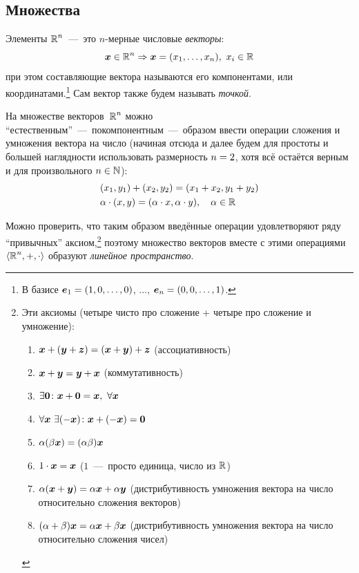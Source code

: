 \documentclass[a4paper,12pt]{article}
\begin{document}

  \subsection{Множества}

  Элементы $\operatorname{\mathbb R}^n$~---~это $n$-мерные числовые \emph{векторы}:
  \[
    \boldsymbol x \in \operatorname{\mathbb R}^n \Rightarrow \boldsymbol x = (x_1, \ldots, x_n),\ x_i \in \operatorname{\mathbb R}
  \]
  при этом составляющие вектора называются его компонентами, или координатами.\footnote{
    В базисе $\bds e_1 \hm= (1, 0, \ldots, 0)$, ..., $\bds e_n \hm= (0, 0, \ldots, 1)$.
  }
  Сам вектор также будем называть \emph{точкой}.

  На множестве векторов~$\operatorname{\mathbb R}^n$ можно ``естественным''~---~покомпонентным~---~образом ввести операции сложения и умножения вектора на число (начиная отсюда и далее будем для простоты и большей наглядности использовать размерность $n \hm= 2$, хотя всё остаётся верным и для произвольного $n \in \mathbb N$):
  \[
    \begin{aligned}
      &(x_1, y_1) + (x_2, y_2) = (x_1 + x_2, y_1 + y_2)\\
      &\alpha \cdot (x, y) = (\alpha \cdot x, \alpha \cdot y),\quad \alpha \in \operatorname{\mathbb R}
    \end{aligned}
  \]

  Можно проверить, что таким образом введённые операции удовлетворяют ряду ``привычных'' аксиом,\footnote{
    Эти аксиомы (четыре чисто про сложение + четыре про сложение и умножение):
    \begin{enumerate}
      \item $\boldsymbol x + (\boldsymbol y + \boldsymbol z) = (\boldsymbol x + \boldsymbol y) + \boldsymbol z$ (ассоциативность)
      \item $\boldsymbol x + \boldsymbol y = \boldsymbol y + \boldsymbol x$ (коммутативность)
      \item $\exists \boldsymbol 0\colon \boldsymbol x + \boldsymbol 0 = \boldsymbol x,\ \forall \boldsymbol x$
      \item $\forall \boldsymbol x\ \exists (-\boldsymbol x)\colon \boldsymbol x + (-\boldsymbol x) = \boldsymbol 0$
      \item $\alpha (\beta \boldsymbol x) = (\alpha \beta) \boldsymbol x$
      \item $1 \cdot \boldsymbol x = \boldsymbol x$ ($1$~---~просто единица, число из $\operatorname{\mathbb R}$)
      \item $\alpha (\boldsymbol x + \boldsymbol y) = \alpha \boldsymbol x + \alpha \boldsymbol y$ (дистрибутивность умножения вектора на число относительно сложения векторов)
      \item $(\alpha + \beta) \boldsymbol x = \alpha \boldsymbol x + \beta \boldsymbol x$ (дистрибутивность умножения вектора на число относительно сложения чисел)
    \end{enumerate}
  } поэтому множество векторов вместе с этими операциями $\langle\operatorname{\mathbb R}^n, +, \cdot\rangle$ образуют \emph{линейное пространство}.
\end{document}
